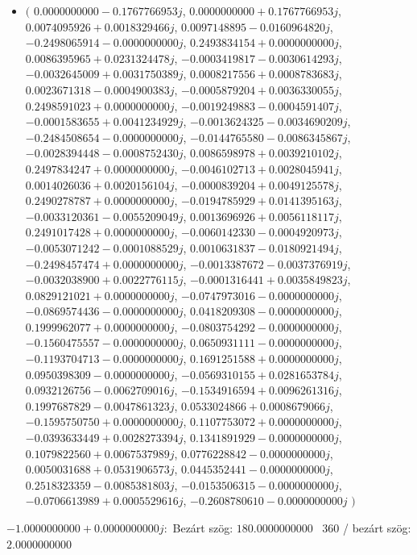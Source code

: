 \documentclass[14pt,a4paper]{article}
\begin{document}
\begin{itemize}
\item
$\big($
$0.0000000000-0.1767766953j$, $0.0000000000+0.1767766953j$, $0.0074095926+0.0018329466j$, $0.0097148895-0.0160964820j$, $-0.2498065914-0.0000000000j$, $0.2493834154+0.0000000000j$, $0.0086395965+0.0231324478j$, $-0.0003419817-0.0030614293j$, $-0.0032645009+0.0031750389j$, $0.0008217556+0.0008783683j$, $0.0023671318-0.0004900383j$, $-0.0005879204+0.0036330055j$, $0.2498591023+0.0000000000j$, $-0.0019249883-0.0004591407j$, $-0.0001583655+0.0041234929j$, $-0.0013624325-0.0034690209j$, $-0.2484508654-0.0000000000j$, $-0.0144765580-0.0086345867j$, $-0.0028394448-0.0008752430j$, $0.0086598978+0.0039210102j$, $0.2497834247+0.0000000000j$, $-0.0046102713+0.0028045941j$, $0.0014026036+0.0020156104j$, $-0.0000839204+0.0049125578j$, $0.2490278787+0.0000000000j$, $-0.0194785929+0.0141395163j$, $-0.0033120361-0.0055209049j$, $0.0013696926+0.0056118117j$, $0.2491017428+0.0000000000j$, $-0.0060142330-0.0004920973j$, $-0.0053071242-0.0001088529j$, $0.0010631837-0.0180921494j$, $-0.2498457474+0.0000000000j$, $-0.0013387672-0.0037376919j$, $-0.0032038900+0.0022776115j$, $-0.0001316441+0.0035849823j$, $0.0829121021+0.0000000000j$, $-0.0747973016-0.0000000000j$, $-0.0869574436-0.0000000000j$, $0.0418209308-0.0000000000j$, $0.1999962077+0.0000000000j$, $-0.0803754292-0.0000000000j$, $-0.1560475557-0.0000000000j$, $0.0650931111-0.0000000000j$, $-0.1193704713-0.0000000000j$, $0.1691251588+0.0000000000j$, $0.0950398309-0.0000000000j$, $-0.0569310155+0.0281653784j$, $0.0932126756-0.0062709016j$, $-0.1534916594+0.0096261316j$, $0.1997687829-0.0047861323j$, $0.0533024866+0.0008679066j$, $-0.1595750750+0.0000000000j$, $0.1107753072+0.0000000000j$, $-0.0393633449+0.0028273394j$, $0.1341891929-0.0000000000j$, $0.1079822560+0.0067537989j$, $0.0776228842-0.0000000000j$, $0.0050031688+0.0531906573j$, $0.0445352441-0.0000000000j$, $0.2518323359-0.0085381803j$, $-0.0153506315-0.0000000000j$, $-0.0706613989+0.0005529616j$, $-0.2608780610-0.0000000000j$
$\big)$
\end{itemize}
$-1.0000000000+0.0000000000j$:\
Bezárt szög: $180.0000000000$ \
360 / bezárt szög: $2.0000000000$\
\end{document}
